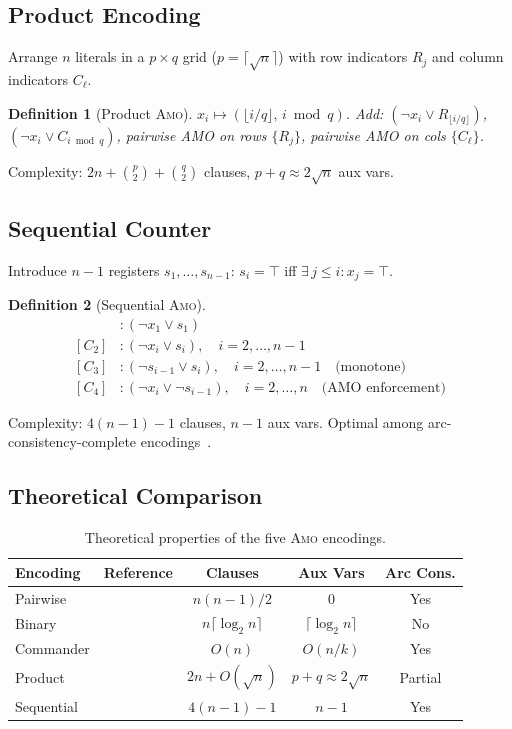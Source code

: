 \documentclass[preprint,10pt,authoryear]{elsarticle}
\newtheorem{definition}{Definition}[section]
\newcommand{\AMO}{\textsc{Amo}}
\begin{document}
\subsection{Product Encoding~\citep{Chen2010}}
Arrange $n$ literals in a $p\times q$ grid ($p=\lceil\sqrt{n}\rceil$)
with row indicators $R_j$ and column indicators $C_\ell$.
\begin{definition}[Product \AMO{}]
$x_i\mapsto(\lfloor i/q\rfloor,\, i\bmod q)$.
Add: $(\neg x_i\vee R_{\lfloor i/q\rfloor})$,
     $(\neg x_i\vee C_{i\bmod q})$,
     pairwise AMO on rows $\{R_j\}$, pairwise AMO on cols $\{C_\ell\}$.
\end{definition}
Complexity: $2n+\binom{p}{2}+\binom{q}{2}$ clauses, $p+q\approx 2\sqrt{n}$ aux vars.

\subsection{Sequential Counter~\citep{Sinz2005}}
Introduce $n-1$ registers $s_1,\ldots,s_{n-1}$: $s_i=\top$ iff
$\exists\, j\leq i: x_j=\top$.
\begin{definition}[Sequential \AMO{}]
\begin{align*}
  [C_1]&:(\neg x_1\vee s_1)\\
  [C_2]&:(\neg x_i\vee s_i),\quad i=2,\ldots,n{-}1\\
  [C_3]&:(\neg s_{i-1}\vee s_i),\quad i=2,\ldots,n{-}1\quad\text{(monotone)}\\
  [C_4]&:(\neg x_i\vee\neg s_{i-1}),\quad i=2,\ldots,n\quad\text{(AMO enforcement)}
\end{align*}
\end{definition}
Complexity: $4(n-1)-1$ clauses, $n-1$ aux vars.
Optimal among arc-consistency-complete encodings~\citep{Sinz2005}.

\subsection{Theoretical Comparison}

\begin{table}[H]
\centering
\caption{Theoretical properties of the five \AMO{} encodings.}
\label{tab:theory}
\small
\begin{tabular}{lcccc}
\toprule
\textbf{Encoding} & \textbf{Reference}
  & \textbf{Clauses} & \textbf{Aux Vars} & \textbf{Arc Cons.}\\
\midrule
Pairwise     & \citet{Cook1971}    & $n(n{-}1)/2$            & $0$                         & Yes\\
Binary       & \citet{Frisch2010}  & $n\lceil\log_2 n\rceil$ & $\lceil\log_2 n\rceil$      & No\\
Commander    & \citet{Klieber2007} & $O(n)$                  & $O(n/k)$                    & Yes\\
Product      & \citet{Chen2010}    & $2n{+}O(\sqrt{n})$      & $p{+}q\approx 2\sqrt{n}$    & Partial\\
Sequential   & \citet{Sinz2005}    & $4(n{-}1){-}1$          & $n{-}1$                     & Yes\\
\bottomrule
\end{tabular}
\end{table}
\end{document}
